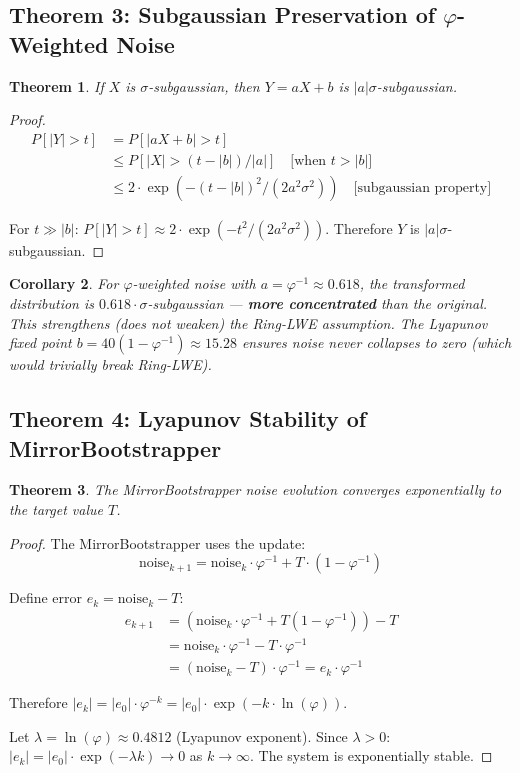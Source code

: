 \documentclass[11pt,a4paper]{article}
\newtheorem{theorem}{Theorem}[section]
\newtheorem{corollary}[theorem]{Corollary}
\begin{document}
\subsection{Theorem 3: Subgaussian Preservation of $\varphi$-Weighted Noise}

\begin{theorem}
If $X$ is $\sigma$-subgaussian, then $Y = aX + b$ is $|a|\sigma$-subgaussian.
\end{theorem}

\begin{proof}
\begin{align*}
P[|Y| > t] &= P[|aX + b| > t] \\
&\leq P[|X| > (t - |b|)/|a|] \quad \text{[when $t > |b|$]} \\
&\leq 2 \cdot \exp(-(t - |b|)^2 / (2a^2\sigma^2)) \quad \text{[subgaussian property]}
\end{align*}

For $t \gg |b|$: $P[|Y| > t] \approx 2 \cdot \exp(-t^2 / (2a^2\sigma^2))$. Therefore $Y$ is $|a|\sigma$-subgaussian.
\end{proof}

\begin{corollary}
For $\varphi$-weighted noise with $a = \varphi^{-1} \approx 0.618$, the transformed distribution is $0.618 \cdot \sigma$-subgaussian — \textbf{more concentrated} than the original. This strengthens (does not weaken) the Ring-LWE assumption. The Lyapunov fixed point $b = 40(1-\varphi^{-1}) \approx 15.28$ ensures noise never collapses to zero (which would trivially break Ring-LWE).
\end{corollary}

\subsection{Theorem 4: Lyapunov Stability of MirrorBootstrapper}

\begin{theorem}
The MirrorBootstrapper noise evolution converges exponentially to the target value $T$.
\end{theorem}

\begin{proof}
The MirrorBootstrapper uses the update:
\[
\text{noise}_{k+1} = \text{noise}_k \cdot \varphi^{-1} + T \cdot (1 - \varphi^{-1})
\]

Define error $e_k = \text{noise}_k - T$:
\begin{align*}
e_{k+1} &= (\text{noise}_k \cdot \varphi^{-1} + T(1-\varphi^{-1})) - T \\
&= \text{noise}_k \cdot \varphi^{-1} - T \cdot \varphi^{-1} \\
&= (\text{noise}_k - T) \cdot \varphi^{-1} = e_k \cdot \varphi^{-1}
\end{align*}

Therefore $|e_k| = |e_0| \cdot \varphi^{-k} = |e_0| \cdot \exp(-k \cdot \ln(\varphi))$.

Let $\lambda = \ln(\varphi) \approx 0.4812$ (Lyapunov exponent). Since $\lambda > 0$: $|e_k| = |e_0| \cdot \exp(-\lambda k) \to 0$ as $k \to \infty$. The system is exponentially stable.
\end{proof}
\end{document}
